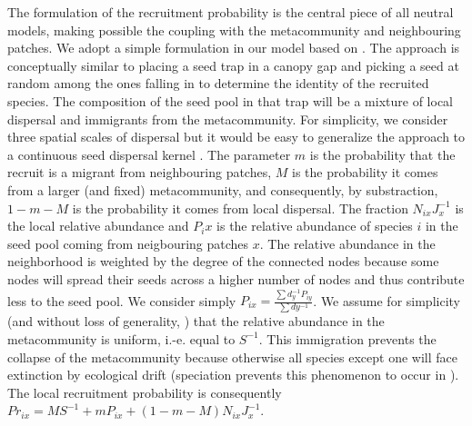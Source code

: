 \documentclass[12pt]{article}
\begin{document}
The formulation of the recruitment probability is the central piece of all
neutral models, making possible the coupling with the metacommunity and
neighbouring patches. We adopt a simple formulation in our model based on
\parencite{Gravel2006}. The approach is conceptually similar to placing a seed
trap in a canopy gap and picking a seed at random among the ones falling
in to determine the identity of the recruited species. The composition of the
seed pool in that trap will be a mixture of local dispersal and immigrants from
the metacommunity. For simplicity, we consider three spatial scales of dispersal
but it would be easy to generalize the approach to a continuous seed dispersal
kernel \parencite{Gravel2006}. The parameter $m$ is the probability that the
recruit is a migrant from neighbouring patches, $M$ is the probability it comes
from a larger (and fixed) metacommunity, and consequently, by substraction,
$1-m-M$ is the probability it comes from local dispersal. The fraction
$N_{ix}J_x^{-1}$ is the local relative abundance and $P_ix$ is the relative
abundance of species $i$ in the seed pool coming from neigbouring patches $x$.
The relative abundance in the neighborhood is weighted by the degree of the
connected nodes because some nodes will spread their seeds across a higher
number of nodes and thus contribute less to the seed pool. We consider simply
$P_{ix} =\frac{\sum d_y^{-1}P_{iy}}{\sum dy^{-1}}$.  We assume for simplicity
(and without loss of generality, \parencite{Bell2000}) that the relative
abundance in the metacommunity is uniform, i.-e. equal to $S^{-1}$. This
immigration prevents the collapse of the metacommunity because otherwise all
species except one will face extinction by ecological drift (speciation prevents
this phenomenon to occur in \textcite{Hubbell2001}). The local recruitment
probability is consequently $Pr_{ix} = MS^{-1} + mP_{ix} +
(1-m-M)N_{ix}J_x^{-1}$.  
\end{document}

